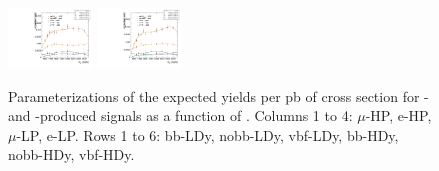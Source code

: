 \begin{figure}[htbp]
  \includegraphics[width=0.2\textwidth]{fig/2Dfit/paramSignalYield_NonVBFSig_mu_LP_vbf_HDy.pdf}
  \includegraphics[width=0.2\textwidth]{fig/2Dfit/paramSignalYield_NonVBFSig_e_LP_vbf_HDy.pdf}\\
  \caption{
    Parameterizations of the expected yields per pb of cross section for \ggF- and \DY-produced signals as a function of \MX.
    Columns 1 to 4: $\mu$-HP, e-HP, $\mu$-LP, e-LP.
    Rows 1 to 6: bb-LDy, nobb-LDy, vbf-LDy, bb-HDy, nobb-HDy, vbf-HDy.
  }
  \label{fig:YieldParam_NonVBF_Run2}
\end{figure}

